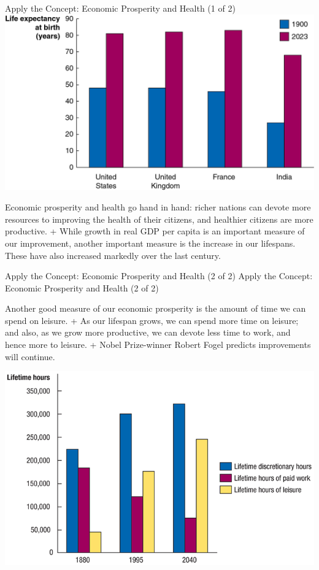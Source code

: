 \documentclass[
  12pt,
  ignorenonframetext,
]{beamer}
\begin{document}
\begin{frame}{Apply the Concept: Economic Prosperity and Health (1 of
2)}
\label{apply-the-concept-economic-prosperity-and-health-1-of-2}
\includegraphics[width=\textwidth,height=0.99\textheight]{imgs3/img_slide07a.png}

Economic prosperity and health go hand in hand: richer nations can
devote more resources to improving the health of their citizens, and
healthier citizens are more productive. + While growth in real GDP per
capita is an important measure of our improvement, another important
measure is the increase in our lifespans. These have also increased
markedly over the last century.
\end{frame}

\begin{frame}{Apply the Concept: Economic Prosperity and Health (2 of
2)}
\label{apply-the-concept-economic-prosperity-and-health-2-of-2}
Apply the Concept: Economic Prosperity and Health (2 of 2)

Another good measure of our economic prosperity is the amount of time we
can spend on leisure. + As our lifespan grows, we can spend more time on
leisure; and also, as we grow more productive, we can devote less time
to work, and hence more to leisure. + Nobel Prize-winner Robert Fogel
predicts improvements will continue.

\includegraphics[width=\textwidth,height=0.99\textheight]{imgs3/img_slide08a.png}
\end{frame}
\end{document}
